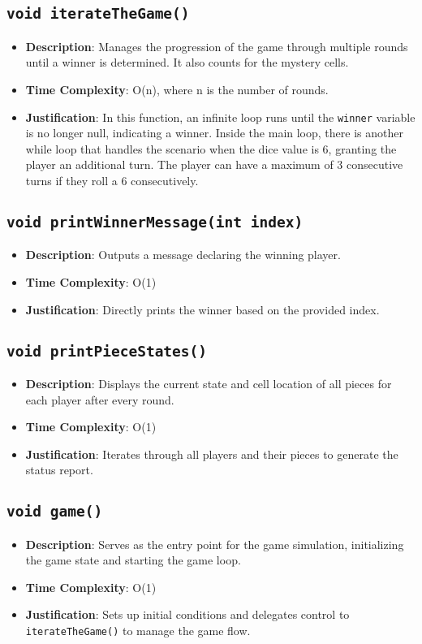 \documentclass{article}
\begin{document}
\subsection{\texttt{void iterateTheGame()}}
\begin{itemize}
    \item \textbf{Description}: Manages the progression of the game through multiple rounds until a winner is determined. It also counts for the mystery cells.
    \item \textbf{Time Complexity}: O(n), where n is the number of rounds.
    \item \textbf{Justification}: In this function, an infinite loop runs until the \texttt{winner} variable is no longer null, indicating a winner. Inside the main loop, there is another while loop that handles the scenario when the dice value is 6, granting the player an additional turn. The player can have a maximum of 3 consecutive turns if they roll a 6 consecutively.
\end{itemize}

\subsection{\texttt{void printWinnerMessage(int index)}}
\begin{itemize}
    \item \textbf{Description}: Outputs a message declaring the winning player.
    \item \textbf{Time Complexity}: O(1)
    \item \textbf{Justification}: Directly prints the winner based on the provided index.
\end{itemize}

\subsection{\texttt{void printPieceStates()}}
\begin{itemize}
    \item \textbf{Description}: Displays the current state and cell location of all pieces for each player after every round.
    \item \textbf{Time Complexity}: O(1)
    \item \textbf{Justification}: Iterates through all players and their pieces to generate the status report.
\end{itemize}

\subsection{\texttt{void game()}}
\begin{itemize}
    \item \textbf{Description}: Serves as the entry point for the game simulation, initializing the game state and starting the game loop.
    \item \textbf{Time Complexity}: O(1)
    \item \textbf{Justification}: Sets up initial conditions and delegates control to \texttt{iterateTheGame()} to manage the game flow.
\end{itemize}
\end{document}
